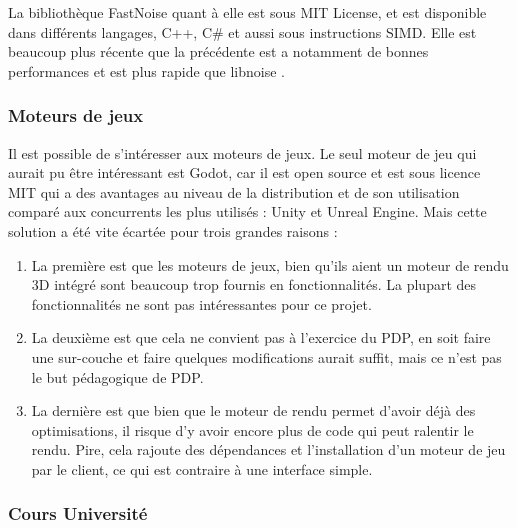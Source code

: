 \documentclass[a4paper]{article}
\begin{document}
    
    La bibliothèque FastNoise quant à elle est sous MIT License, et est disponible dans différents langages, C++, C\# et aussi sous instructions SIMD. Elle est beaucoup plus récente que la précédente est a notamment de bonnes performances et est plus rapide que libnoise \protect\footnotemark.\\
    
    
 \subsubsection{Moteurs de jeux}

    Il est possible de s'intéresser aux moteurs de jeux. Le seul moteur de jeu qui aurait pu être intéressant est Godot, car il est open source et est sous licence MIT qui a des avantages au niveau de la distribution et de son utilisation comparé aux concurrents les plus utilisés : Unity et Unreal Engine. Mais cette solution a été vite écartée pour trois grandes raisons : 
    \begin{enumerate}
        \item  La première est que les moteurs de jeux, bien qu'ils aient un moteur de rendu 3D intégré sont beaucoup trop fournis en fonctionnalités. La plupart des fonctionnalités ne sont pas intéressantes pour ce projet. 
        
        \item La deuxième est que cela ne convient pas à l'exercice du PDP, en soit faire une sur-couche et faire quelques modifications aurait suffit, mais ce n'est pas le but pédagogique de PDP.
        
        \item  La dernière est que bien que le moteur de rendu permet d'avoir déjà des optimisations, il risque d'y avoir encore plus de code qui peut ralentir le rendu. Pire, cela rajoute des dépendances et l'installation d'un moteur de jeu par le client, ce qui est contraire à une interface simple.
    \end{enumerate}

 \subsubsection{Cours Université}
    
\end{document}
